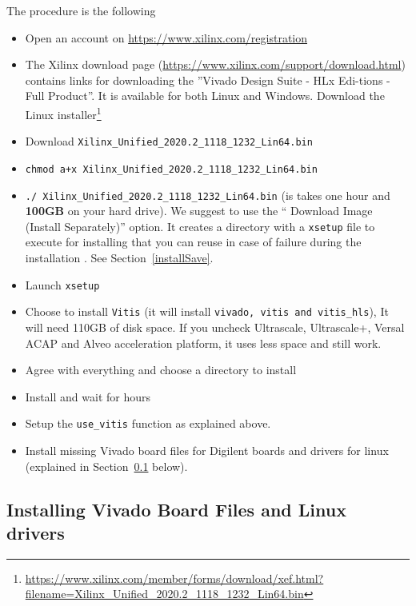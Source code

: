 The procedure is the following
\begin{itemize}
\item Open an account on \url{https://www.xilinx.com/registration}
\item The Xilinx download page
  (\url{https://www.xilinx.com/support/download.html}) contains links for
  downloading the ”Vivado Design Suite - HLx Edi-tions - Full Product”.
  It is available for both Linux and Windows.  Download the  Linux installer\footnote{\url{https://www.xilinx.com/member/forms/download/xef.html?filename=Xilinx_Unified_2020.2_1118_1232_Lin64.bin}}
\item Download \verb#Xilinx_Unified_2020.2_1118_1232_Lin64.bin#
\item \verb#chmod a+x Xilinx_Unified_2020.2_1118_1232_Lin64.bin#
\item \verb#./ Xilinx_Unified_2020.2_1118_1232_Lin64.bin# (is takes one hour and {\bf 100GB} on your hard drive).
  We suggest to use the `` Download Image (Install Separately)'' option. It creates a directory with a {\tt xsetup} file to execute for installing that you can reuse in case of failure during the installation . See Section~\ref{installSave}.
\item Launch {\tt xsetup}
\item Choose to install {\tt Vitis} (it will install {\tt vivado, vitis and vitis\_hls}), It will need 110GB of disk space. If you uncheck Ultrascale, Ultrascale+, Versal ACAP and Alveo acceleration platform,  it uses less space and still work.
\item Agree with everything and choose a directory to install 
\item Install and wait for hours
\item Setup the {\tt use\_vitis} function as explained above.
\item Install missing Vivado board files for Digilent boards and drivers for linux (explained in Section~\ref{board-file-install} below).
\end{itemize}





\subsection{Installing Vivado Board Files and Linux drivers}
\label{board-file-install}

